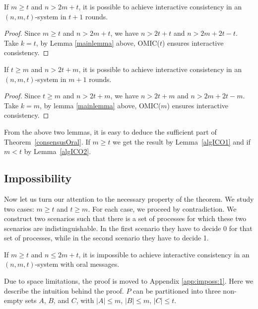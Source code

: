 \begin{lemma}\label{algICO1}
  If $m \geqslant t$ and $n>2m+t$, it is possible to achieve interactive consistency in an $(n,m,t)$-system 
  in $t+1$ rounds.
\end{lemma}

\begin{proof}
  Since $m \geqslant t$ and $n>2m+t$, we have $n>2t+t$ and $n >2m+2t-t$. Take
  $k=t$, by Lemma \ref{mainlemma} above, OMIC($t$) ensures
  interactive consistency. 
\end{proof}

\begin{lemma}\label{algICO2}
  If $t \geqslant m$ and $n>2t+m$, it is possible to achieve interactive consistency in an $(n,m,t)$-system 
 in $m+1$ rounds.
\end{lemma}

\begin{proof}
  Since $t \geqslant m$ and $n>2t+m$, we have $n>2t+m$ and $n >2m+2t-m$. Take
  $k=m$, by lemma \ref{mainlemma} above, OMIC($m$) ensures
  interactive consistency.
\end{proof}

From the above two lemmas, it is easy to deduce the sufficient part of 
Theorem~\ref{consensusOral}. 
If $m \geqslant t$ we get the result by Lemma~\ref{algICO1} and  if $m<t$ by Lemma~\ref{algICO2}.



\subsection{Impossibility}

Now let us turn our attention to the necessary property of the theorem. We study two cases: $m \geqslant t$
and $t \geqslant m$. For each case, we proceed by contradiction.
We construct two scenarios such that there is a set of processes for which these two scenarios are indistinguishable. 
In the first scenario they have to decide 0 for that set of processes, while in the second scenario they have to decide 1.






\begin{lemma}\label{imposs:1}
  If $m \geqslant t$ and $n \leqslant 2m+t$, it is impossible to achieve interactive consistency in an $(n,m,t)$-system with oral messages.
  \end{lemma}

Due to space limitations, the proof is moved to Appendix \ref{app:imposs:1}. Here we describe the intuition behind the proof.
  $P$ can be partitioned into three non-empty sets $A$, $B$, and $C$,
  with $| A | \leqslant m$, $| B | \leqslant m$, $| C | \leqslant t$. 
  
